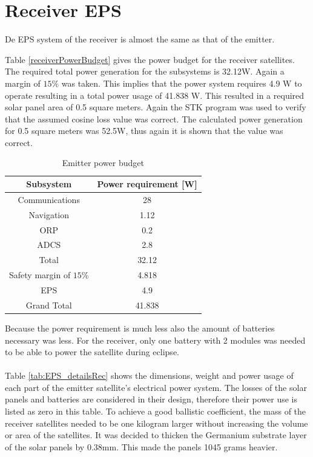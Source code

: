 \section{Receiver EPS}
\label{receiver_EPS}

De EPS system of the receiver is almost the same as that of the emitter.

Table \ref{receiverPowerBudget} gives the power budget for the receiver satellites. The required total power generation for the subsystems is 32.12W. Again a margin of $15\%$ was taken. This implies that the power system requires 4.9 W to operate resulting in a total power usage of 41.838 W. This resulted in a required solar panel area of 0.5 square meters. Again the STK program was used to verify that the assumed cosine loss value was correct. The calculated power generation for 0.5 square meters was 52.5W, thus again it is shown that the value was correct.

\begin{table}
\centering
\begin{tabular}{cc}
\toprule
Subsystem & Power requirement [W]\\
\midrule
Communications & 28\\
Navigation & 1.12\\
ORP & 0.2\\
ADCS & 2.8\\
\midrule
Total & 32.12\\
Safety margin of $15\%$ & 4.818\\
EPS & 4.9\\
\midrule
\midrule
Grand Total & 41.838\\
\bottomrule
\end{tabular}
\caption{Emitter power budget}
\label{tab:emitterPowerBudget}
\end{table}

Because the power requirement is much less also the amount of batteries necessary was less. For the receiver, only one battery with 2 modules was needed to be able to power the satellite during eclipse.
\\\\
Table \ref{tab:EPS_detailsRec} shows the dimensions, weight and power usage of each part of the emitter satellite's electrical power system. The losses of the solar panels and batteries are considered in their design, therefore their power use is listed as zero in this table. To achieve a good ballistic coefficient, the mass of the receiver satellites needed to be one kilogram larger without increasing the volume or area of the satellites. It was decided to thicken the Germanium substrate layer of the solar panels by 0.38mm. This made the panels 1045 grams heavier.

